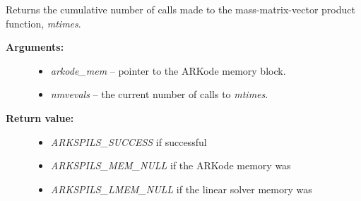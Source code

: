 \documentclass[letterpaper,10pt,english]{sphinxmanual}
\begin{document}
\begin{fulllineitems}
\label{c_interface/User_callable:ARKSpilsGetNumMtimesEvals}
Returns the cumulative number of calls made to the
mass-matrix-vector product function, \emph{mtimes}.
\begin{description}
\item[{\textbf{Arguments:}}] \leavevmode\begin{itemize}
\item {} 
\emph{arkode\_mem} -- pointer to the ARKode memory block.

\item {} 
\emph{nmvevals} -- the current number of calls to \emph{mtimes}.

\end{itemize}

\item[{\textbf{Return value:}}] \leavevmode\begin{itemize}
\item {} 
\emph{ARKSPILS\_SUCCESS} if successful

\item {} 
\emph{ARKSPILS\_MEM\_NULL} if the ARKode memory was 

\item {} 
\emph{ARKSPILS\_LMEM\_NULL} if the linear solver memory was 

\end{itemize}

\end{description}

\end{fulllineitems}

\end{document}
